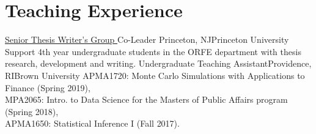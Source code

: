 \documentclass[10pt,a4paper,roman]{moderncv}        %
\begin{document}
\vspace{-0.3cm}
\section{Teaching Experience}
{\color{blue}\href{https://orfe.princeton.edu/undergraduate/stwg}{Senior Thesis
    Writer's Group }\color{black} Co-Leader}
{Princeton, NJ}{Princeton University}
{Support 4th year undergraduate students in the ORFE department with thesis research, development and writing.}
{Undergraduate Teaching Assistant}{Providence, RI}{Brown University}
{APMA1720: Monte Carlo Simulations with Applications to Finance (Spring 2019), \\
MPA2065: Intro. to Data Science for the Masters of Public Affairs program (Spring 2018),
\\
APMA1650: Statistical Inference I (Fall 2017).
}

\end{document}
